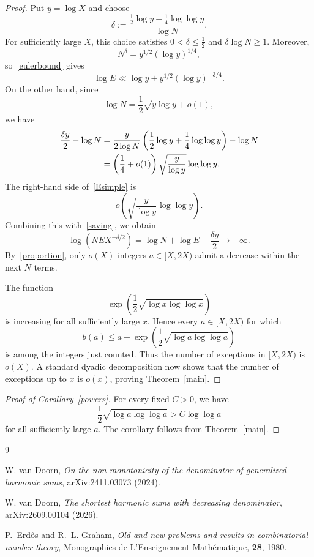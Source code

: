 \documentclass{amsart}
\begin{document}
\begin{proof}
Put $y=\log X$ and choose
$$
\delta:=\frac{\frac12\log y+\frac14\log\log y}{\log N}.
$$
For sufficiently large $X$, this choice satisfies $0<\delta\le\frac12$ and $\delta\log N\ge1$. Moreover,
$$
N^\delta=y^{1/2}(\log y)^{1/4},
$$
so~\eqref{eulerbound} gives
\begin{equation}\label{Esimple}
\log E\ll \log y+y^{1/2}(\log y)^{-3/4}.
\end{equation}
On the other hand, since
$$
\log N=\frac12\sqrt{y\log y}+o(1),
$$
we have
\begin{align}
\frac{\delta y}{2}-\log N
&=\frac{y}{2\log N}\left(\frac12\log y+\frac14\log\log y\right)-\log N \notag\\
&=\left(\frac14+o(1)\right)\sqrt{\frac{y}{\log y}}\log\log y.\label{saving}
\end{align}
The right-hand side of~\eqref{Esimple} is
$$
o\left(\sqrt{\frac{y}{\log y}}\log\log y\right).
$$
Combining this with~\eqref{saving}, we obtain
$$
\log\left(NE X^{-\delta/2}\right)
=\log N+\log E-\frac{\delta y}{2}\longrightarrow-\infty.
$$
By~\eqref{proportion}, only $o(X)$ integers $a\in[X,2X)$ admit a decrease within the next $N$ terms.

The function
$$
\exp\left(\frac12\sqrt{\log x\log\log x}\right)
$$
is increasing for all sufficiently large $x$. Hence every $a\in[X,2X)$ for which
$$
b(a)\le a+\exp\left(\frac12\sqrt{\log a\log\log a}\right)
$$
is among the integers just counted. Thus the number of exceptions in $[X,2X)$ is $o(X)$. A standard dyadic decomposition now shows that the number of exceptions up to $x$ is $o(x)$, proving Theorem~\ref{main}.
\end{proof}

\begin{proof}[Proof of Corollary~\ref{powers}]
For every fixed $C>0$, we have
$$
\frac12\sqrt{\log a\log\log a}>C\log\log a
$$
for all sufficiently large $a$. The corollary follows from Theorem~\ref{main}.
\end{proof}

\begin{thebibliography}{9}

W. van Doorn,
\emph{On the non-monotonicity of the denominator of generalized harmonic sums},
arXiv:2411.03073 (2024).

W. van Doorn,
\emph{The shortest harmonic sums with decreasing denominator},
arXiv:2609.00104 (2026).

P.~Erd\H{o}s and R.~L. Graham,
\emph{Old and new problems and results in combinatorial number theory},
Monographies de L'Enseignement Math\'ematique, \textbf{28},
1980.

\end{thebibliography}
\end{document}
